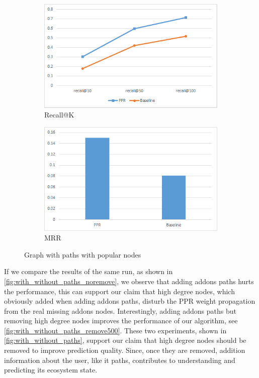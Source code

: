 \documentclass[11pt,oneside]{book}
\begin{document}
\begin{figure}[t]
\centering
\begin{subfigure}[b]{0.49\textwidth}
	\centering
\includegraphics[scale=0.49]{figures/minlen2noremoveWithPaths.png}
\caption{Recall@K}
\label{fig:minlen2noremoveRecall}
\end{subfigure}
\begin{subfigure}[b]{0.49\textwidth}
	\centering
\includegraphics[scale=0.49]{figures/minlen2noremoveWithPathsMRR.png}
\caption{MRR}
\label{fig:minlen2noremoveMRR}
\end{subfigure}
\caption{Graph with paths with popular nodes}
	\label{fig:minlen2noremoveWithPaths}
\end{figure}

If we compare the results of the same run, as shown in
\autoref{fig:with_without_paths_noremove}, we observe that adding
addons paths hurts the performance, this can support our claim that
high degree nodes, which obviously added when adding addons paths,
disturb the PPR weight propagation from the real missing addons
nodes. Interestingly, adding addons paths but removing high degree
nodes improves the performance of our algorithm, see
\autoref{fig:with_without_paths_remove500}. These two experiments,
shown in \autoref{fig:with_without_paths}, support our claim that high
degree nodes should be removed to improve prediction quality. Since,
once they are removed, addition information about the user, like it
paths, contributes to understanding and predicting its ecosystem
state.
\end{document}
